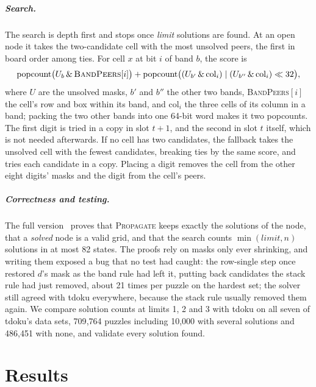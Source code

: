 \documentclass[a4paper,USenglish,cleveref,anonymous]{lipics-v2021}
\let\origtextsc\textsc
\renewcommand{\textsc}[1]{\textup{\origtextsc{#1}}}
\newif\ifanon
\newcommand{\selfcite}[1]{\ifanon[anonymized]\else\cite{#1}\fi}
\begin{document}
\subparagraph{Search.} The search is depth first and stops once \emph{limit} solutions are found. At an open node it takes
the two-candidate cell with the most unsolved peers, the first in board order among ties. For cell $x$ at bit $i$ of
band $b$, the score is
\[
\mathrm{popcount}\bigl(U_b \,\&\, \textsc{BandPeers}[i]\bigr) + \mathrm{popcount}\bigl((U_{b'} \,\&\, \mathrm{col}_i) \mid
(U_{b''} \,\&\, \mathrm{col}_i)\ll 32\bigr),
\]
where $U$ are the unsolved masks, $b'$ and $b''$ the other two bands, \textsc{BandPeers}$[i]$ the cell's row and box
within its band, and $\mathrm{col}_i$ the three cells of its column in a band; packing the two other bands into one
64-bit word makes it two popcounts. The first digit is tried in a copy in slot $t+1$, and the second in slot $t$
itself, which is not needed afterwards. If no cell has two candidates, the fallback takes the unsolved cell with the
fewest candidates, breaking ties by the same score, and tries each candidate in a copy. Placing a digit removes the
cell from the other eight digits' masks and the digit from the cell's peers.

\subparagraph{Correctness and testing.} The full version~\selfcite{kelly2026full} proves that \textsc{Propagate} keeps exactly
the solutions of the node, that a \emph{solved} node is a valid grid, and that the search counts $\min(\mathit{limit},
n)$ solutions in at most 82 states. The proofs rely on masks only ever shrinking, and writing them exposed a bug that no
test had caught: the row-single step once restored $d$'s mask as the band rule had left it, putting back candidates the
stack rule had just removed, about 21 times per puzzle on the hardest set; the solver still agreed with tdoku
everywhere, because the stack rule usually removed them again. We compare solution counts at limits 1, 2 and 3 with
tdoku on all seven of tdoku's data sets, 709{,}764 puzzles including 10{,}000 with several solutions and 486{,}451 with
none, and validate every solution found.

\section{Results}
\label{sec:results}
\end{document}
